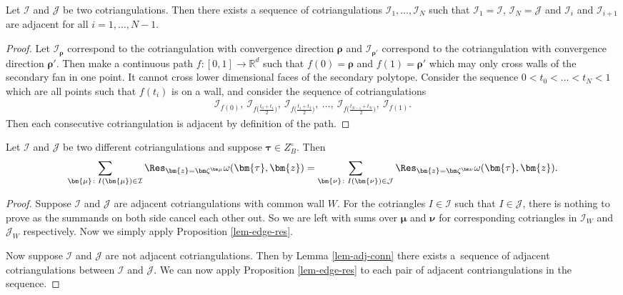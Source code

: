 \begin{Lemma}\label{lem-adj-conn}
Let $\mathcal{I}$ and $\mathcal{J}$ be two cotriangulations. Then there exists a sequence of cotriangulations $\mathcal{I}_1,\dots,\mathcal{I}_N$ such that $\mathcal{I}_1 = \mathcal{I}$, $\mathcal{I}_N = \mathcal{J}$ and $\mathcal{I}_{i}$ and $\mathcal{I}_{i+1}$ are adjacent for all $i=1,\dots,N-1$.
\end{Lemma}

\begin{proof}
Let $\mathcal{I}_{\bm\rho}$ correspond to the cotriangulation with convergence direction $\bm\rho$ and $\mathcal{I}_{\bm\rho'}$ correspond to the cotriangulation with convergence direction $\bm\rho'$. Then make a continuous path $f\colon [0,1] \rightarrow \mathbb{R}^d$ such that $f(0) = \bm\rho$ and $f(1) = \bm\rho'$ which may only cross walls of the secondary fan in one point. It cannot cross lower dimensional faces of the secondary polytope. Consider the sequence $0 < t_0 < \dots < t_N < 1$ which are all points such that $f(t_i)$ is on a wall, and consider the sequence of cotriangulations
\begin{gather*}
\mathcal{I}_{f(0)},\ \mathcal{I}_{f\big(\frac{t_{0} + t_{1}}{2}\big)},\
\mathcal{I}_{f\big(\frac{t_{1} + t_{2}}{2}\big)},\ \dots,\
\mathcal{I}_{f\big(\frac{t_{N-1} + t_{N}}{2}\big)},\ \mathcal{I}_{f(1)}.
\end{gather*}
Then each consecutive cotriangulation is adjacent by definition of the path.
\end{proof}

\begin{Corollary}\label{cor-gen-tri}
Let $\mathcal{I}$ and $\mathcal{J}$ be two different cotriangulations
and suppose $\bm\tau\in Z_B^\circ$.
Then
\begin{gather*}
\sum_{\bm{\mu}\colon I(\bm{\mu})\in\mathcal{I}}\Res_{\bm{z}=\bm\zeta^{\bm\mu}}\omega(\bm{\tau},\bm{z})
=\sum_{\bm{\nu}\colon I(\bm{\nu})\in\mathcal{J}}\Res_{\bm{z}=\bm\zeta^{\bm\nu}}\omega(\bm{\tau},\bm{z}).
\end{gather*}
\end{Corollary}

\begin{proof}
Suppose $\mathcal{I}$ and $\mathcal{J}$ are adjacent cotriangulations with common wall $W$.
For the cotriangles $I \in \mathcal{I}$ such that $I \in \mathcal{J}$, there is nothing to prove as the summands on both side cancel each other out. So we are left with sums over $\bm{\mu}$ and $\bm\nu$ for corresponding cotriangles in $\mathcal{I}_W$ and $\mathcal{J}_W$ respectively. Now we simply apply Proposition \ref{lem-edge-res}.

Now suppose $\mathcal{I}$ and $\mathcal{J}$ are not adjacent cotriangulations. Then by Lemma \ref{lem-adj-conn} there exists a~sequence of adjacent cotriangulations between $\mathcal{I}$ and $\mathcal{J}$. We can now apply Proposition \ref{lem-edge-res} to each pair of adjacent contriangulations in the sequence.
\end{proof}


